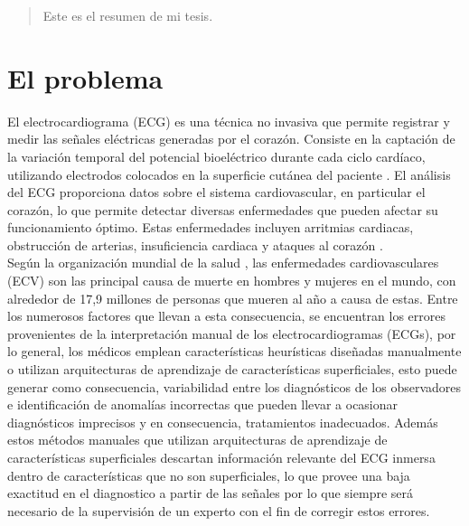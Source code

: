 \documentclass[spanish,11pt,letterpaper,oneside]{memoir}
\begin{document}
\begin{abstract}
  Este es el resumen de mi tesis.
\end{abstract}
\newpage

\tableofcontents*
\mainmatter


\chapter{El problema}
	El electrocardiograma (ECG) es una técnica no invasiva que permite registrar y medir las señales eléctricas generadas por el corazón. Consiste en la captación de la variación temporal del potencial bioeléctrico durante cada ciclo cardíaco, utilizando electrodos colocados en la superficie cutánea del paciente \cite{ZHANG2021113}. El análisis del ECG proporciona datos sobre el sistema cardiovascular, en particular el corazón, lo que permite detectar diversas enfermedades que pueden afectar su funcionamiento óptimo. Estas enfermedades incluyen arritmias cardiacas, obstrucción de arterias, insuficiencia cardiaca y ataques al corazón \cite{MedlineECG}.\\ Según la organización mundial de la salud \cite{Who}, las enfermedades cardiovasculares (ECV) son las principal causa de muerte en hombres y mujeres en el mundo, con alrededor de 17,9 millones de personas que mueren al año a causa de estas. Entre los numerosos factores que llevan a esta consecuencia, se encuentran los errores provenientes de la interpretación manual de los electrocardiogramas (ECGs), por lo general, los médicos emplean características heurísticas diseñadas manualmente o utilizan arquitecturas de aprendizaje de características superficiales, esto puede generar como consecuencia, variabilidad entre los diagnósticos de los observadores e identificación de anomalías incorrectas que pueden llevar a ocasionar diagnósticos imprecisos y en consecuencia, tratamientos inadecuados. Además estos métodos manuales que utilizan arquitecturas de aprendizaje de características superficiales descartan información relevante del ECG inmersa dentro de características que no son superficiales, lo que provee una baja exactitud en el diagnostico a partir de las señales por lo que siempre será necesario de la supervisión de un experto con el fin de corregir estos errores. 
\end{document}
